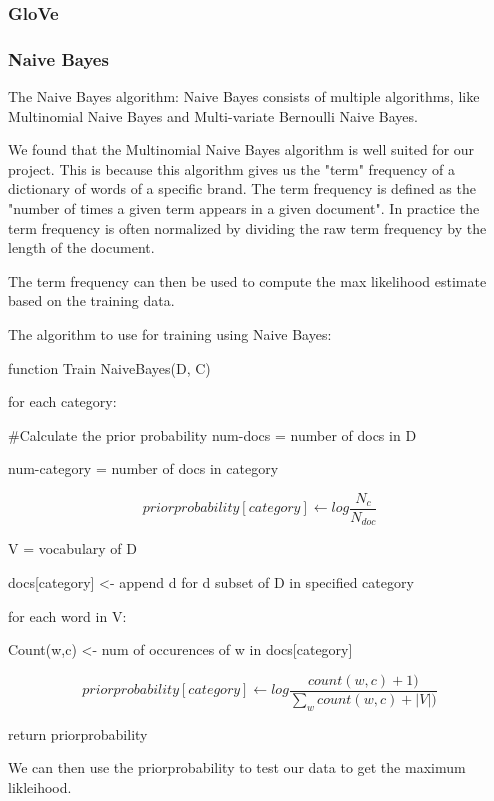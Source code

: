 \documentclass{article}
\begin{document}
\subsubsection {GloVe}

\subsubsection {Naive Bayes}
The Naive Bayes algorithm:
Naive Bayes consists of multiple algorithms, like Multinomial Naive Bayes and Multi-variate Bernoulli Naive Bayes.

We found that the Multinomial Naive Bayes algorithm is well suited for our project. This is because this algorithm gives us the "term" frequency of a dictionary of words of a specific brand.
The term frequency is defined as the "number of times a given term appears in a given document". In practice the term frequency is often normalized by dividing the raw term frequency by the length of the document.

The term frequency can then be used to compute the max likelihood estimate based on the training data.

The algorithm to use for training using Naive Bayes:

function Train NaiveBayes(D, C)

for each category:

#Calculate the prior probability
num-docs = number of docs in D

num-category = number of docs in category

\[priorprobability[category] \leftarrow log \frac{N_{c}}{N_{doc}}\]

 V = vocabulary of D

 docs[category] <- append d for d subset of D in specified category

 for each word in V:

    Count(w,c) <- num of occurences of w in docs[category]

    \[priorprobability[category] \leftarrow log \frac{count(w,c) +1)}{\sum_{w} count(w,c) + |V|)}\]

return priorprobability

We can then use the priorprobability to test our data to get the maximum likleihood.

\maketitle
\end{document}

